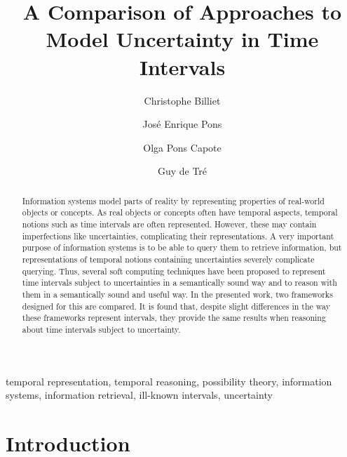 \documentclass[twocolumn,a4paper]{article}
\theoremstyle{definition}
\begin{document}
\title{A Comparison of Approaches to Model Uncertainty in Time Intervals}

\begin{aug}
\author[1]{Christophe Billiet}
\author[2]{Jos\'{e} Enrique Pons}
\author[2]{Olga Pons Capote}
\author[1]{Guy de Tr\'{e}}
\end{aug}


\maketitle
\thispagestyle{empty}

\begin{abstract}
Information systems model parts of reality by representing properties of real-world objects or concepts. As real objects or concepts often have temporal aspects, temporal notions such as time intervals are often represented. However, these may contain imperfections like uncertainties, complicating their representations. A very important purpose of information systems is to be able to query them to retrieve information, but representations of temporal notions containing uncertainties severely complicate querying. Thus, several soft computing techniques have been proposed to represent time intervals subject to uncertainties in a semantically sound way and to reason with them in a semantically sound and useful way. In the presented work, two frameworks designed for this are compared. It is found that, despite slight differences in the way these frameworks represent intervals, they provide the same results when reasoning about time intervals subject to uncertainty.
\end{abstract}

\begin{keywords}
temporal representation, temporal reasoning, possibility theory, information systems, information retrieval, ill-known intervals, uncertainty
\end{keywords}

\section{\label{sec:introduction}Introduction}

\end{document}

